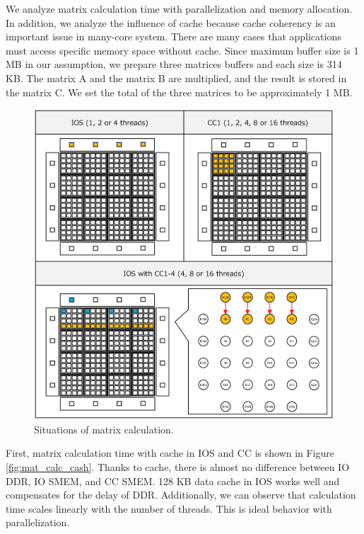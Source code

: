\documentclass{sig-alternate-05-2015}
\begin{document}
We analyze matrix calculation time with parallelization and memory allocation.
In addition, we analyze the influence of cache because cache coherency is an important issue in many-core system.
There are many cases that applications must access specific memory space without cache.
Since maximum buffer size is 1 MB in our assumption, we prepare three matrices buffers and each size is 314 KB.
The matrix A and the matrix B are multiplied, and the result is stored in the matrix C.
We set the total of the three matrices to be approximately 1 MB.

\begin{figure}[t]
  \centering
  \includegraphics[width=1.0\linewidth]{../figure/matrix_calculation.eps}
  \caption{\label{fig:mat_calc}
    Situations of matrix calculation.}
\end{figure}

First, matrix calculation time with cache in IOS and CC is shown in Figure \ref{fig:mat_calc_cash}.
Thanks to cache, there is almost no difference between IO DDR, IO SMEM, and CC SMEM.
128 KB data cache in IOS works well and compensates for the delay of DDR.
Additionally, we can observe that calculation time scales linearly with the number of threads.
This is ideal behavior with parallelization.
\end{document}
